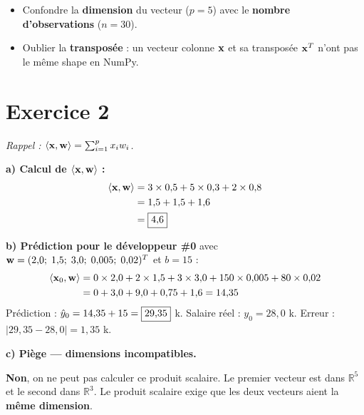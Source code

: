 \begin{attentionbox}
    \begin{itemize}
        \item Confondre la \textbf{dimension} du vecteur ($p = 5$) avec le \textbf{nombre d'observations} ($n = 30$).
        \item Oublier la \textbf{transpos\'{e}e} : un vecteur colonne $\mathbf{x}$ et sa transpos\'{e}e $\mathbf{x}^T$ n'ont pas le m\^{e}me shape en NumPy.
    \end{itemize}
\end{attentionbox}

\section*{Exercice 2 \hfill \exofondamental}
\textit{Rappel : $\langle \mathbf{x}, \mathbf{w} \rangle = \sum_{i=1}^{p} x_i w_i$.}

\separateur

\textbf{a) Calcul de $\langle \mathbf{x}, \mathbf{w} \rangle$ :}
\begin{align*}
    \langle \mathbf{x}, \mathbf{w} \rangle &= 3 \times 0{,}5 + 5 \times 0{,}3 + 2 \times 0{,}8 \\
                     &= 1{,}5 + 1{,}5 + 1{,}6 \\
                     &= \boxed{4{,}6}
\end{align*}

\textbf{b) Pr\'{e}diction pour le d\'{e}veloppeur \#0} avec
$\mathbf{w} = (2{,}0;\; 1{,}5;\; 3{,}0;\; 0{,}005;\; 0{,}02)^T$ et $b = 15$ :
\begin{align*}
    \langle \mathbf{x}_0, \mathbf{w} \rangle &= 0 \times 2{,}0 + 2 \times 1{,}5 + 3 \times 3{,}0 + 150 \times 0{,}005 + 80 \times 0{,}02 \\
                       &= 0 + 3{,}0 + 9{,}0 + 0{,}75 + 1{,}6 = 14{,}35
\end{align*}
Pr\'{e}diction : $\hat{y}_0 = 14{,}35 + 15 = \boxed{29{,}35}$ k\texteuro.
Salaire r\'{e}el : $y_0 = 28{,}0$ k\texteuro. Erreur : $|29{,}35 - 28{,}0| = 1{,}35$ k\texteuro.

\textbf{c) Pi\`{e}ge --- dimensions incompatibles.}

\textbf{Non}, on ne peut pas calculer ce produit scalaire.
Le premier vecteur est dans $\mathbb{R}^5$ et le second dans $\mathbb{R}^3$.
Le produit scalaire exige que les deux vecteurs aient la \textbf{m\^{e}me dimension}.

